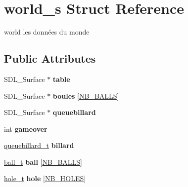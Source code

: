 \hypertarget{structworld__s}{\section{world\-\_\-s Struct Reference}
\label{structworld__s}
}


world les données du monde  


\subsection*{Public Attributes}
\begin{DoxyCompactItemize}
\item 
\hypertarget{structworld__s_aa9646dfaffa5e0b1cbf60d9eae003913}{S\-D\-L\-\_\-\-Surface $\ast$ {\bfseries table}}\label{structworld__s_aa9646dfaffa5e0b1cbf60d9eae003913}

\item 
\hypertarget{structworld__s_a985801a5a7f0ab1f33bab00b0896341a}{S\-D\-L\-\_\-\-Surface $\ast$ {\bfseries boules} \mbox{[}\hyperlink{main_8c_aa1c63d462da9f1adaec241e3f5fce91c}{N\-B\-\_\-\-B\-A\-L\-L\-S}\mbox{]}}\label{structworld__s_a985801a5a7f0ab1f33bab00b0896341a}

\item 
\hypertarget{structworld__s_ac922870c4ef9cff2b3dd334437e5e5c7}{S\-D\-L\-\_\-\-Surface $\ast$ {\bfseries queuebillard}}\label{structworld__s_ac922870c4ef9cff2b3dd334437e5e5c7}

\item 
\hypertarget{structworld__s_a693aa82d082fe3467969094559b9bc0f}{int {\bfseries gameover}}\label{structworld__s_a693aa82d082fe3467969094559b9bc0f}

\item 
\hypertarget{structworld__s_aa5ab20ea18d54622cc57789d68307686}{\hyperlink{structqueuebillard__s}{queuebillard\-\_\-t} {\bfseries billard}}\label{structworld__s_aa5ab20ea18d54622cc57789d68307686}

\item 
\hypertarget{structworld__s_a2e6ef91610d5fc2dfb94d099323dfbad}{\hyperlink{structball__s}{ball\-\_\-t} {\bfseries ball} \mbox{[}\hyperlink{main_8c_aa1c63d462da9f1adaec241e3f5fce91c}{N\-B\-\_\-\-B\-A\-L\-L\-S}\mbox{]}}\label{structworld__s_a2e6ef91610d5fc2dfb94d099323dfbad}

\item 
\hypertarget{structworld__s_a3375c7fd4eba065fdc9f81e7ef1d7eb9}{\hyperlink{structhole__s}{hole\-\_\-t} {\bfseries hole} \mbox{[}\hyperlink{main_8c_a91c8c5c1b1d20b0179a711bf6c43160f}{N\-B\-\_\-\-H\-O\-L\-E\-S}\mbox{]}}\label{structworld__s_a3375c7fd4eba065fdc9f81e7ef1d7eb9}

\end{DoxyCompactItemize}


